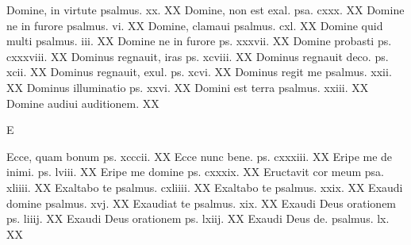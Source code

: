 \documentclass[a5paper,10pt]{book}
\begin{document}
\begin{multicols}{2}
\newline Domine, in virtute psalmus. xx. \hfill XX
\newline Domine, non est exal. psa. cxxx. \hfill XX
\newline Domine ne in furore psalmus. vi. \hfill XX
\newline Domine, clamaui psalmus. cxl. \hfill XX
\newline Domine quid multi psalmus. iii. \hfill XX
\newline Domine ne in furore ps. xxxvii. \hfill XX
\newline Domine probasti ps. cxxxviii. \hfill XX
\newline Dominus regnauit, iras ps. xcviii. \hfill XX
\newline Dominus regnauit deco. ps. xcii. \hfill XX
\newline Dominus regnauit, exul. ps. xcvi. \hfill XX
\newline Dominus regit me psalmus. xxii. \hfill XX
\newline Dominus illuminatio ps. xxvi. \hfill XX
\newline Domini est terra psalmus. xxiii. \hfill XX
\newline Domine audiui auditionem. \hfill XX
\newline \vspace{-1.75em}
\begin{center}
\color{red} E
\end{center}
\vspace{-.75em}
\par \noindent Ecce, quam bonum ps. xcccii. \hfill XX
\newline Ecce nunc bene. ps. cxxxiii. \hfill XX
\newline Eripe me de inimi. ps. lviii. \hfill XX
\newline Eripe me domine ps. cxxxix. \hfill XX
\newline Eructavit cor meum psa. xliiii. \hfill XX
\newline Exaltabo te psalmus. cxliiii. \hfill XX
\newline Exaltabo te psalmus. xxix. \hfill XX
\newline Exaudi domine psalmus. xvj. \hfill XX
\newline Exaudiat te psalmus. xix. \hfill XX
\newline Exaudi Deus orationem ps. liiij. \hfill XX
\newline Exaudi Deus orationem ps. lxiij. \hfill XX
\newline Exaudi Deus de. psalmus. lx. \hfill XX

\end{multicols}
\end{document}
